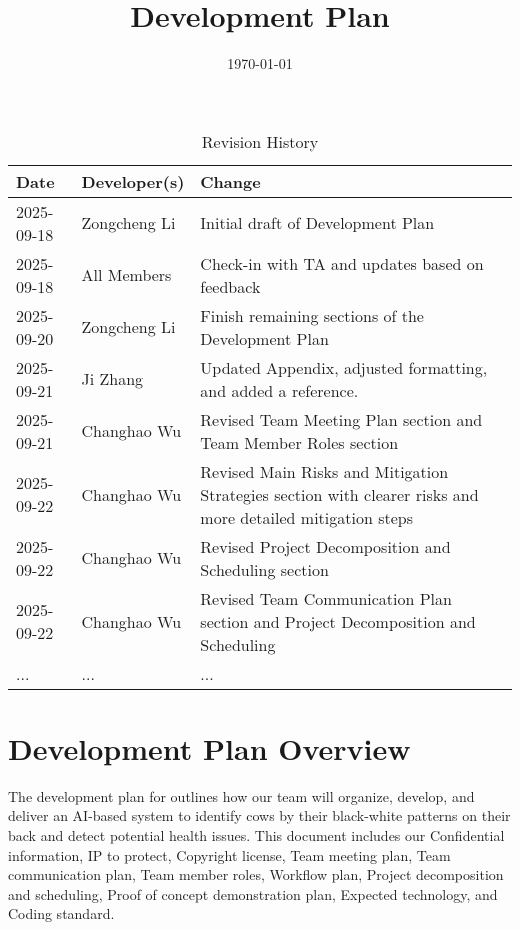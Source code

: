 \documentclass{article}
\title{Development Plan\\\progname}
\author{\authname}
\date{\today}
\begin{document}
\maketitle

\begin{table}[hp]
\caption{Revision History} \label{TblRevisionHistory}
\begin{tabularx}{\textwidth}{llX}
\toprule
\textbf{Date} & \textbf{Developer(s)} & \textbf{Change}\\
\midrule
2025-09-18 & Zongcheng Li   & Initial draft of Development Plan \\
2025-09-18 & All Members    & Check-in with TA and updates based on feedback \\
2025-09-20 & Zongcheng Li   & Finish remaining sections of the Development Plan \\
2025-09-21 & Ji Zhang       & Updated Appendix, adjusted formatting, and added a reference.\\
2025-09-21 & Changhao Wu    & Revised Team Meeting Plan section and Team Member Roles section \\
2025-09-22 & Changhao Wu    & Revised Main Risks and Mitigation Strategies section with clearer risks and more detailed mitigation steps \\
2025-09-22 & Changhao Wu    & Revised Project Decomposition and Scheduling section \\
2025-09-22 & Changhao Wu    & Revised Team Communication Plan section and Project Decomposition and Scheduling\\
... & ... & ...\\

\bottomrule
\end{tabularx}
\end{table}

\newpage{}


\section*{Development Plan Overview}
The development plan for \progname{} outlines how our team will organize, develop, 
and deliver an AI-based system to identify cows by their black-white patterns on their back 
and detect potential health issues. This document includes our Confidential information, 
IP to protect, Copyright license, Team meeting plan, Team communication plan, Team member 
roles, Workflow plan, Project decomposition and scheduling, Proof of concept demonstration 
plan, Expected technology, and Coding standard.
\end{document}
